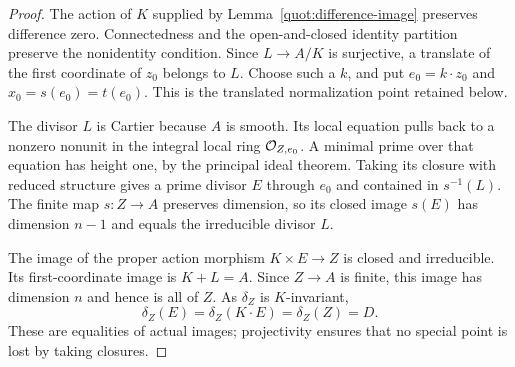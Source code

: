 \begin{proof}
The action of \(K\) supplied by
Lemma~\ref{quot:difference-image} preserves difference zero.
Connectedness and the open-and-closed identity partition preserve
the nonidentity condition.  Since \(L\to A/K\) is surjective, a
translate of the first coordinate of \(z_0\) belongs to \(L\).
Choose such a \(k\), and put \(e_0=k\cdot z_0\) and
\(x_0=s(e_0)=t(e_0)\).  This is the translated normalization point
retained below.

The divisor \(L\) is Cartier because \(A\) is smooth.
Its local equation pulls back to a nonzero nonunit in the integral
local ring \(\mathcal O_{Z,e_0}\).
A minimal prime over that equation has height one, by the principal
ideal theorem.  Taking its closure with reduced structure gives a
prime divisor \(E\) through \(e_0\) and contained in \(s^{-1}(L)\).
The finite map \(s:Z\to A\) preserves dimension, so its closed image
\(s(E)\) has dimension \(n-1\) and equals the irreducible divisor \(L\).

The image of the proper action morphism \(K\times E\to Z\) is closed
and irreducible.  Its first-coordinate image is
\(K+L=A\).  Since \(Z\to A\) is finite, this image has dimension \(n\)
and hence is all of \(Z\).  As \(\delta_Z\) is \(K\)-invariant,
\[
                      \delta_Z(E)
                       =\delta_Z(K\cdot E)
                       =\delta_Z(Z)=D .
\]
These are equalities of actual images; projectivity ensures that
no special point is lost by taking closures.
\end{proof}

